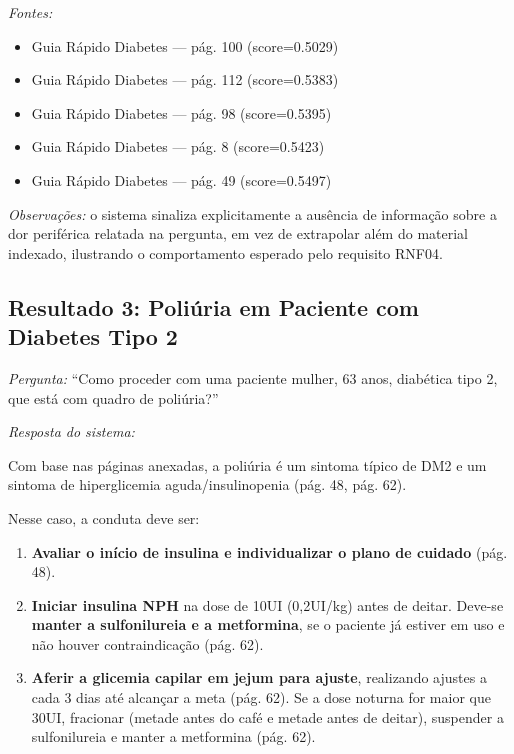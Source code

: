 \documentclass[conference,a4paper]{IEEEtran}
\begin{document}
\textit{Fontes:}
\begin{itemize}
  \item {Guia Rápido Diabetes} --- pág. 100 (score=0.5029)
  \item {Guia Rápido Diabetes} --- pág. 112 (score=0.5383)
  \item {Guia Rápido Diabetes} --- pág. 98 (score=0.5395)
  \item {Guia Rápido Diabetes} --- pág. 8 (score=0.5423)
  \item {Guia Rápido Diabetes} --- pág. 49 (score=0.5497)
\end{itemize}

\medskip
\noindent\textit{Observações:} o sistema sinaliza explicitamente
a ausência de informação sobre a dor periférica relatada na
pergunta, em vez de extrapolar além do material indexado,
ilustrando o comportamento esperado pelo requisito RNF04.

\subsection{Resultado 3: Poliúria em Paciente com Diabetes Tipo 2}

\noindent\textit{Pergunta:} ``Como proceder com uma paciente
mulher, 63 anos, diabética tipo 2, que está com quadro de
poliúria?''

\medskip
\noindent\textit{Resposta do sistema:}

Com base nas páginas anexadas, a poliúria é um sintoma típico de
DM2 e um sintoma de hiperglicemia aguda/insulinopenia (pág. 48,
pág. 62).

Nesse caso, a conduta deve ser:
\begin{enumerate}
  \item \textbf{Avaliar o início de insulina e individualizar o
        plano de cuidado} (pág. 48).
  \item \textbf{Iniciar insulina NPH} na dose de 10UI (0,2UI/kg)
        antes de deitar. Deve-se \textbf{manter a sulfonilureia e
        a metformina}, se o paciente já estiver em uso e não
        houver contraindicação (pág. 62).
  \item \textbf{Aferir a glicemia capilar em jejum para ajuste},
        realizando ajustes a cada 3 dias até alcançar a meta
        (pág. 62). Se a dose noturna for maior que 30UI,
        fracionar (metade antes do café e metade antes de
        deitar), suspender a sulfonilureia e manter a metformina
        (pág. 62).
\end{enumerate}
\end{document}
